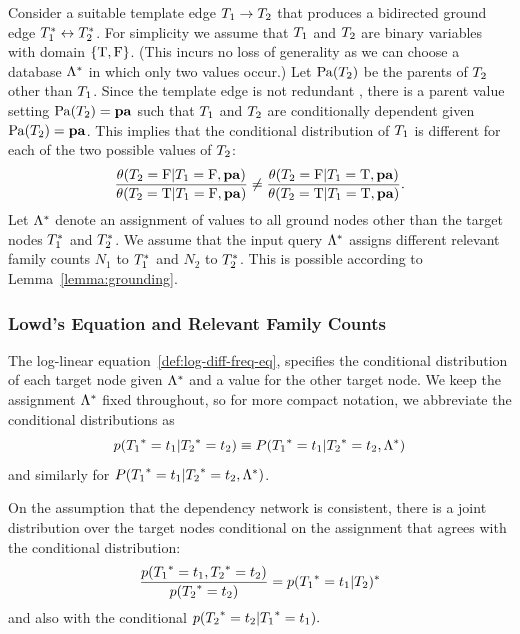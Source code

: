 \documentclass[runningheads,a4paper]{llncs}
\begin{document}
Consider a suitable template edge $T_{1} \rightarrow T_{2}$ that produces a bidirected ground edge $T_{1}^{*}\hspace{0.0ex} \leftrightarrow T_{2}^{*}\hspace{0.0ex}$. For simplicity we assume that $T_{1}$ and $T_{2}$ are binary variables with domain $\{\mathrm{T},\mathrm{F}\}$. (This incurs no loss of generality as we can choose a database $\Lambda^{*}\hspace{0.0ex}$ in which only two values occur.) Let $\mathrm{Pa}(T_{2})$ be the parents of $T_{2}$ other than $T_{1}$. Since the template edge is not redundant \cite{Pearl1988}, there is a parent value setting $\mathrm{Pa}(T_{2}) = \mathbf{pa}$ such that $T_{1}$ and $T_{2}$ are conditionally dependent given $\mathrm{Pa}(T_{2}) = \mathbf{pa}$. This implies that the conditional distribution of $T_{1}$ is different for each of the two possible values of $T_{2}$:
\begin{equation} \label{eq:dependence}
\frac{\theta(T_{2} = \mathrm{F}|T_{1} = \mathrm{F},\mathbf{pa})}{\theta(T_{2} = \mathrm{T}|T_{1} = \mathrm{F},\mathbf{pa})} \neq \frac{\theta(T_{2} = \mathrm{F}|T_{1} = \mathrm{T},\mathbf{pa})}{\theta(T_{2} = \mathrm{T}|T_{1} = \mathrm{T},\mathbf{pa})}.
\end{equation}
Let $\Lambda^{*}\hspace{0.0ex}$ denote an assignment of values to all ground nodes other than the target nodes $T_{1}^{*}\hspace{0.0ex}$ and $ T_{2}^{*}\hspace{0.0ex}$. We assume that the input query $\Lambda^{*}\hspace{0.0ex}$ assigns different relevant family counts $N_{1}$ to $T_{1}^{*}\hspace{0.0ex}$ and $N_{2}$ to $T_{2}^{*}\hspace{0.0ex}$. This is possible according to Lemma~\ref{lemma:grounding}. 
\subsubsection{Lowd's Equation and Relevant Family Counts}
The log-linear equation~\ref{def:log-diff-freq-eq}, specifies the conditional distribution of each target node given $\Lambda^{*}\hspace{0.0ex}$ and a value for the other target node. We keep the assignment $\Lambda^{*}\hspace{0.0ex}$ fixed throughout, so for more compact notation, we abbreviate the conditional distributions as
$$p({T_{1}}^{*}\hspace{0.0ex} = t_{1}| {T_{2}}^{*}\hspace{0.0ex} = t_{2}) \equiv P({T_{1}}^{*}\hspace{0.0ex} = t_{1}|{T_{2}}^{*}\hspace{0.0ex} = t_{2},\Lambda^{*}\hspace{0.0ex})$$ 
and similarly for $P({T_{1}}^{*}\hspace{0.0ex} = t_{1}|{T_{2}}^{*}\hspace{0.0ex} = t_{2},\Lambda^{*}\hspace{0.0ex})$.

On the assumption that the dependency network is consistent, there is a joint distribution over the target nodes conditional on the assignment that agrees with the conditional distribution:
$$\frac{p({T_{1}}^{*}\hspace{0.0ex} = t_{1}, {T_{2}}^{*}\hspace{0.0ex} = t_{2})}{p({T_{2}}^{*}\hspace{0.0ex} = t_{2})}= p({T_{1}}^{*}\hspace{0.0ex} = t_{1}| {T_{2}})^{*}\hspace{0.0ex}$$
and also with the conditional $p({T_{2}}^{*}\hspace{0.0ex} = t_{2}| {T_{1}}^{*}\hspace{0.0ex}=t_{1}).$
\end{document}
